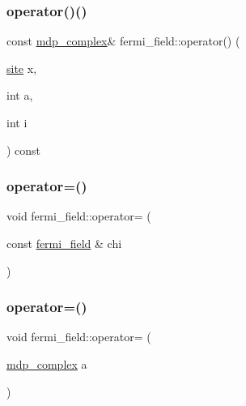 \mbox{\label{classfermi__field_a959379c213ae582b95fa81ec343e7510}} 
\subsubsection{\texorpdfstring{operator()()}{operator()()}\hspace{0.1cm}{\footnotesize\ttfamily [4/4]}}
{\footnotesize\ttfamily const \hyperlink{classmdp__complex}{mdp\+\_\+complex}\& fermi\+\_\+field\+::operator() (\begin{DoxyParamCaption}\item[{\hyperlink{mdp__compatibility__macros_8h_aa6f1179c424e48adef1cedf7c436eb75}{site}}]{x,  }\item[{int}]{a,  }\item[{int}]{i }\end{DoxyParamCaption}) const\hspace{0.3cm}{\ttfamily [inline]}}

\mbox{\label{classfermi__field_abfaaf9b43f054fde18eaef3d80b1edf4}} 
\subsubsection{\texorpdfstring{operator=()}{operator=()}\hspace{0.1cm}{\footnotesize\ttfamily [1/2]}}
{\footnotesize\ttfamily void fermi\+\_\+field\+::operator= (\begin{DoxyParamCaption}\item[{const \hyperlink{classfermi__field}{fermi\+\_\+field} \&}]{chi }\end{DoxyParamCaption})\hspace{0.3cm}{\ttfamily [inline]}}

\mbox{\label{classfermi__field_a1fb7ce7e54f45a334ee55dc7250aba89}} 
\subsubsection{\texorpdfstring{operator=()}{operator=()}\hspace{0.1cm}{\footnotesize\ttfamily [2/2]}}
{\footnotesize\ttfamily void fermi\+\_\+field\+::operator= (\begin{DoxyParamCaption}\item[{\hyperlink{classmdp__complex}{mdp\+\_\+complex}}]{a }\end{DoxyParamCaption})\hspace{0.3cm}{\ttfamily [inline]}}



